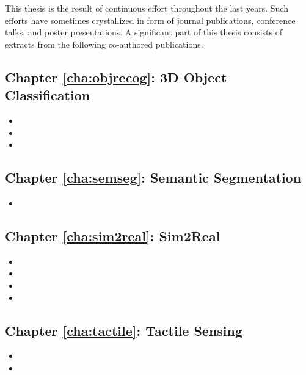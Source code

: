 This thesis is the result of continuous effort throughout the last years. Such efforts have sometimes crystallized in form of journal publications, conference talks, and poster presentations. A significant part of this thesis consists of extracts from the following co-authored publications.

\subsection{Chapter \ref{cha:objrecog}: 3D Object Classification}

\begin{itemize}
  \item {}
  \item {}
  \item {}
\end{itemize}

\subsection{Chapter \ref{cha:semseg}: Semantic Segmentation}

\begin{itemize}
  \item {}
\end{itemize}

\subsection{Chapter \ref{cha:sim2real}: Sim2Real}

\begin{itemize}
    \item {}
    \item {}
    \item {}
    \item {}
  \end{itemize}

\subsection{Chapter \ref{cha:tactile}: Tactile Sensing}

\begin{itemize}
  \item {}
  \item {}
\end{itemize}

